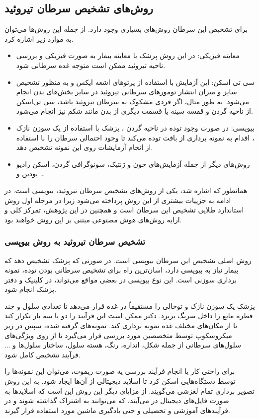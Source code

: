 \subsection{روش‌های تشخیص سرطان تیروئید}\label{subsec:روش-های-تشخیص-سرطان-تیروئید}

برای تشخیص این سرطان روش‌های بسیاری وجود دارد.
از جمله این روش‌ها می‌توان به موارد زیر اشاره کرد.

\begin{itemize}
    \item معاینه فیزیکی:
    در این روش پزشک با معاینه بیمار به صورت فیزیکی و بررسی ناحیه تیروئید ممکن است متوجه غده سرطانی شود.
    \item سی تی اسکن:
    این آزمایش با استفاده از پرتوهای اشعه ایکس و به منظور تشخیص سایز و میزان انتشار تومورهای سرطانی تیروئید در سایر بخش‌های بدن انجام می‌شود.
    به طور مثال، اگر فردی مشکوک به سرطان تیروئید باشد، سی تی‌اسکن از ناحیه گردن و قفسه سینه یا قسمت دیگری از بدن مانند شکم نیز انجام می‌شود.
    \item بیوپسی:
    در صورت وجود توده در ناحیه گردن ، پزشک با استفاده از يک سوزن نازک ، اقدام به نمونه برداری از بافت توده می‌کند تا وجود احتمالی سرطان را با استفاده از انجام آزمایشات روی این نمونه تشخیص دهد.
    \item روش‌های دیگر از جمله آزمایش‌های خون و ژنتیک، سونوگرافی گردن، اسکن رادیو یودین و \ldots
\end{itemize}

همانطور که اشاره شد، یکی از روش‌های تشخیص سرطان تیروئید، بیوپسی است.
در ادامه به جزییات بیشتری از این روش پرداخته می‌شود زیرا در مرحله اول روش استاندارد طلایی تشخیص این سرطان است و همچنین در این پژوهش، تمرکز کلی و ارایه روش‌های هوش مصنوعی مبتنی بر این روش خواهند بود.

\subsubsection{تشخیص سرطان تیروئید به روش بیوپسی}
روش اصلی تشخیص این سرطان بیوپسی است.
در صورتی که پزشک تشخیص دهد که بیمار نیاز به بیوپسی دارد، اسان‌ترین راه برای تشخیص سرطانی بودن توده،
نمونه برداری سوزنی است.
این نوع بیوپسی در بعضی مواقع می‌تواند، در کلینیک و دفتر پزشک انجام شود.

پزشک یک سوزن نازک و توخالی را مستقیماً در غده قرار می‌دهد تا تعدادی سلول و چند قطره مایع را داخل سرنگ بریزد.
دکتر ممکن است این فرآیند را دو یا سه بار تکرار کند تا از مکان‌های مختلف غده نمونه برداری کند.
نمونه‌های گرفته شده، سپس در زیر میکروسکوپ توسط متخصصین مورد بررسی قرار می‌گیرد تا از روی ویژگی‌های سلول‌های سرطانی از جمله شکل، اندازه، رنگ، هسته سلول، ساختار سلول‌ها و ... فرآیند تشخیص کامل شود.

برای راحتی کار یا انجام فرآیند بررسی یه صورت ریموت، می‌توان این نمونه‌ها را توسط دستگاه‌هایی اسکن کرد تا اسلاید دیجیتالی از آن‌ها ایجاد شود.
به این روش تصویر برداری تمام لغزشی می‌گویند.
از مزایای دیگر این روش این است که اسلاید‌ها به صورت فایل‌های دیجیتال در می‌آیند، که می‌توانند به اشتراک گذاشته شوند و در فرآیند‌های آموزشی و تحصیلی و حتی یادگیری ماشین مورد استفاده قرار گیرند.

